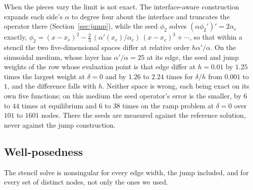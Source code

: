 \documentclass[11pt]{amsart}
\theoremstyle{definition}
\theoremstyle{remark}
\begin{document}
When the pieces vary the limit is not exact. The interface-aware
construction expands each side's $\alpha$ to degree four about the
interface and truncates the operator there (Section~\ref{sec:jump}), while
the seed $\phi_2$ solves $(\alpha \phi_2')' = 2 \alpha_e$ exactly,
$\phi_2 = (x - x_e)^2 - \tfrac23\, (\alpha'(x_e) / \alpha_e)\, (x - x_e)^3
+ \cdots$, so that within a stencil the two five-dimensional spaces differ
at relative order $h \alpha' / \alpha$. On the sinusoidal medium, whose
layer has $\alpha' / \alpha = 25$ at its edge, the seed and jump weights
of the row whose evaluation point is that edge differ at $h = 0.01$ by
$1.25$ times the largest weight at $\delta = 0$ and by $1.26$ to $2.24$
times for $\delta / h$ from $0.001$ to $1$, and the difference falls with
$h$.
Neither space is wrong, each being exact on its own five functions; on this
medium the seed operator's error is the smaller, by $6$ to $44$ times at
equilibrium and $6$ to $38$ times on the ramp problem at $\delta = 0$ over
$101$ to $1601$ nodes. There the seeds are measured against the reference
solution, never against the jump construction.

\subsection{Well-posedness}
\label{sec:ect}
The stencil solve is nonsingular for every edge width, the jump included,
and for every set of distinct nodes, not only the ones we used.
\end{document}
